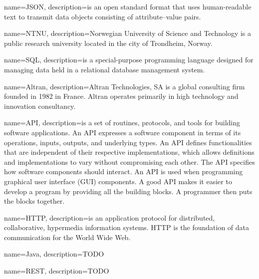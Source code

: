 \documentclass[../document]{subfiles}
\begin{document}
 {
   name=JSON,
   description={is an open standard format that uses human-readable text to transmit data objects consisting of attribute–value pairs.}
}

{
   name=NTNU,
   description={Norwegian University of Science and Technology is a public research university located in the city of Trondheim, Norway.}
}

{
   name=SQL,
   description={is a special-purpose programming language designed for managing data held in a relational database management system.}
}

{
   name=Altran,
   description={Altran Technologies, SA is a global consulting firm founded in 1982 in France. Altran operates primarily in high technology and innovation consultancy.}
}

{
   name=API,
   description={is a set of routines, protocols, and tools for building software applications. An API expresses a software component in terms of its operations, inputs, outputs, and underlying types. An API defines functionalities that are independent of their respective implementations, which allows definitions and implementations to vary without compromising each other. The API specifies how software components should interact. An API is used when programming graphical user interface (GUI) components. A good API makes it easier to develop a program by providing all the building blocks. A programmer then puts the blocks together.}
}

{
   name=HTTP,
   description={is an application protocol for distributed, collaborative, hypermedia information systems. HTTP is the foundation of data communication for the World Wide Web.}
}

{
   name=Java,
   description={TODO}
}


{
   name=REST,
   description={TODO}
}
\end{document}
